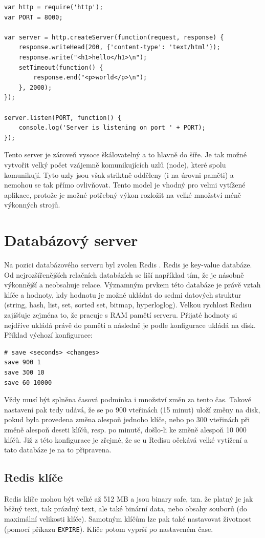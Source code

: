 \begin{verbatim}
var http = require('http');
var PORT = 8000;

var server = http.createServer(function(request, response) {
	response.writeHead(200, {'content-type': 'text/html'});
	response.write("<h1>hello</h1>\n");
	setTimeout(function() {
		response.end("<p>world</p>\n");
	}, 2000);
});

server.listen(PORT, function() {
	console.log('Server is listening on port ' + PORT);
});
\end{verbatim}

Tento server je zároveň vysoce škálovatelný a to hlavně do šíře. Je tak možné vytvořit velký počet vzájemně komunikujících uzlů (node), které spolu komunikují. Tyto uzly jsou však striktně odděleny (i na úrovni paměti) a nemohou se tak přímo ovlivňovat. Tento model je vhodný pro velmi vytížené aplikace, protože je možné potřebný výkon rozložit na velké množství méně výkonných strojů.

\section{Databázový server}
Na pozici databázového serveru byl zvolen Redis \cite{redis}. Redis je key-value databáze. Od nejrozšířenějších relačních databázích se liší například tím, že je násobně výkonnější a neobsahuje relace. Významným prvkem této databáze je právě vztah klíče a hodnoty, kdy hodnotu je možné ukládat do sedmi datových struktur (string, hash, list, set, sorted set, bitmap, hyperloglog). Velkou rychlost Redisu zajišťuje zejména to, že pracuje s RAM pamětí serveru. Přijaté hodnoty si nejdříve ukládá právě do paměti a následně je podle konfigurace ukládá na disk. Příklad výchozí konfigurace:

\begin{verbatim}
# save <seconds> <changes>
save 900 1
save 300 10
save 60 10000
\end{verbatim}

Vždy musí být splněna časová podmínka i množství změn za tento čas. Takové nastavení pak tedy udává, že se po 900 vteřinách (15 minut) uloží změny na disk, pokud byla provedena změna alespoň jednoho klíče, nebo po 300 vteřinách při změně alespoň deseti klíčů, resp. po minutě, došlo-li ke změně alespoň 10 000 klíčů. Již z této konfigurace je zřejmé, že se u Redisu očekává velké vytížení a tato databáze je na to připravena.

\subsection{Redis klíče}
Redis klíče mohou být velké až 512 MB a jsou binary safe, tzn. že platný je jak běžný text, tak prázdný text, ale také binární data, nebo obsahy souborů (do maximální velikosti klíče). Samotným klíčům lze pak také nastavovat životnost (pomocí příkazu \texttt{EXPIRE}). Klíče potom vyprší po nastaveném čase.

